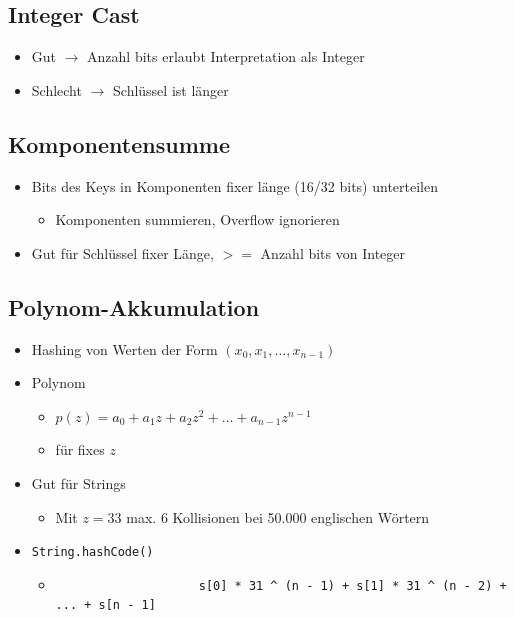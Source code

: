 \documentclass[a4paper, landscape, 8pt]{scrartcl}
\begin{document}
\begin{multicols*}{4}
            \subsection{Integer Cast}
                \begin{itemize}
                    \item Gut $\to$ Anzahl bits erlaubt Interpretation als Integer
                    \item Schlecht $\to$ Schlüssel ist länger
                \end{itemize}

            \subsection{Komponentensumme}
                \begin{itemize}
                    \item Bits des Keys in Komponenten fixer länge (16/32 bits) unterteilen
                    \begin{itemize}
                        \item Komponenten summieren, Overflow ignorieren
                    \end{itemize}
                    \item Gut für Schlüssel fixer Länge, $>=$ Anzahl bits von Integer
                \end{itemize}

            \subsection{Polynom-Akkumulation}
                \begin{itemize}
                    \item Hashing von Werten der Form $(x_0, x_1, \dots, x_{n-1})$
                    \item Polynom
                    \begin{itemize}
                        \item $p(z) = a_0 + a_1 z + a_2 z^2 + \dots + a_{n-1} z^{n-1}$
                        \item für fixes $z$
                    \end{itemize}
                    \item Gut für Strings
                    \begin{itemize}
                        \item Mit $z = 33$ max. 6 Kollisionen bei 50.000 englischen Wörtern
                    \end{itemize}
                    \item \texttt{String.hashCode()}
                    \begin{itemize}
                        \item \begin{lstlisting}
                    s[0] * 31 ^ (n - 1) + s[1] * 31 ^ (n - 2) + ... + s[n - 1]
                        \end{lstlisting}
                    \end{itemize}
                \end{itemize}


\end{multicols*}
\end{document}
